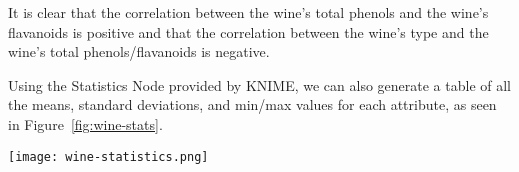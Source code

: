 \documentclass[
  coursecode={CMPE 251},
  assignmentname={Exercise 1},
  studentnumber=20053722,
  name={Bryan Hoang}
]{
  ltxanswer%
}
\begin{document}
\begin{questions}
\begin{solution}
      It is clear that the correlation between the wine's total phenols and the wine's flavanoids is positive and that the correlation between the wine's type and the wine's total phenols/flavanoids is negative.

      Using the Statistics Node provided by KNIME, we can also generate a table of all the means, standard deviations, and min/max values for each attribute, as seen in Figure~\ref{fig:wine-stats}.

      \newpage
      \begin{center}
        \captionsetup{type=figure}
        \texttt{[image: wine-statistics.png]}
        \label{fig:wine-stats}
      \end{center}
    \end{solution}
  \end{questions}
\end{document}
